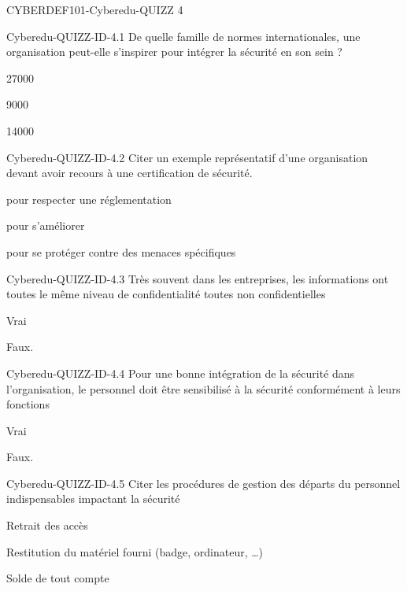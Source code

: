 \documentclass[12pt]{article}
\begin{document}
   \begin{quiz}{CYBERDEF101-Cyberedu-QUIZZ 4}
  
\begin{multi}[multiple=true]{Cyberedu-QUIZZ-ID-4.1}
De quelle famille de normes internationales, une organisation peut-elle s'inspirer pour int\'egrer la s\'ecurit\'e en son sein ?
\item*27000
\item 9000
\item 14000
\end{multi}
\begin{multi}[multiple=true]{Cyberedu-QUIZZ-ID-4.2}
	Citer un exemple repr\'esentatif d'une organisation devant avoir recours \`a une certification de s\'ecurit\'e. 
\item* pour respecter une r\'eglementation
\item* pour s'am\'eliorer
\item pour se prot\'eger contre des menaces sp\'ecifiques
\end{multi}

\begin{multi}[multiple=true]{Cyberedu-QUIZZ-ID-4.3}
Tr\`es souvent dans les entreprises, les informations ont toutes le m\^eme niveau de confidentialit\'e  toutes non confidentielles  
\item  Vrai 
\item* Faux.
\end{multi}

\begin{multi}[multiple=true]{Cyberedu-QUIZZ-ID-4.4}
Pour une bonne int\'egration de la s\'ecurit\'e dans l'organisation, le personnel doit \^etre sensibilis\'e \`a la s\'ecurit\'e conform\'ement \`a leurs fonctions 
\item* Vrai 
\item Faux.
\end{multi}


\begin{multi}[multiple=true]{Cyberedu-QUIZZ-ID-4.5}
Citer les proc\'edures de gestion des d\'eparts du personnel indispensables impactant la s\'ecurit\'e 
\item* Retrait des acc\`es 
\item* Restitution du mat\'eriel fourni (badge, ordinateur, …)
\item Solde de tout compte
\end{multi}



\end{quiz}
\end{document}
